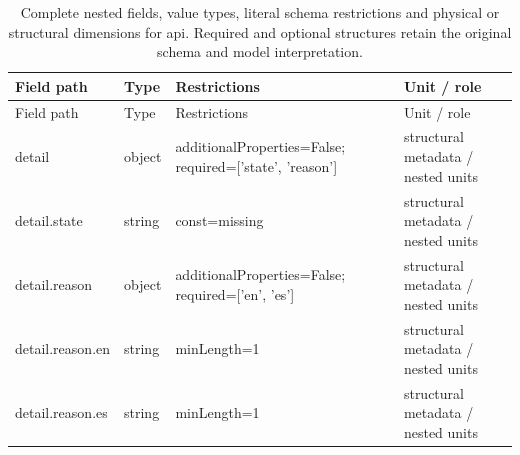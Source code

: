 \begingroup\footnotesize\setlength{\tabcolsep}{3pt}
\begin{longtable}{@{}>{\raggedright\arraybackslash}p{}>{\raggedright\arraybackslash}p{}>{\raggedright\arraybackslash}p{}>{\raggedright\arraybackslash}p{}@{}}
\caption{Complete nested fields, value types, literal schema restrictions and physical or structural dimensions for api. Required and optional structures retain the original schema and model interpretation.}\label{tab:nested-api}\\
\toprule Field path & Type & Restrictions & Unit / role\\\midrule\endfirsthead
\toprule Field path & Type & Restrictions & Unit / role\\\midrule\endhead
\bottomrule\endfoot
detail & object & additionalProperties=\allowbreak{}False; required=\allowbreak{}['state', 'reason'] & structural metadata /\allowbreak{} nested units\\
detail.\allowbreak{}state & string & const=\allowbreak{}missing & structural metadata /\allowbreak{} nested units\\
detail.\allowbreak{}reason & object & additionalProperties=\allowbreak{}False; required=\allowbreak{}['en', 'es'] & structural metadata /\allowbreak{} nested units\\
detail.\allowbreak{}reason.\allowbreak{}en & string & minLength=\allowbreak{}1 & structural metadata /\allowbreak{} nested units\\
detail.\allowbreak{}reason.\allowbreak{}es & string & minLength=\allowbreak{}1 & structural metadata /\allowbreak{} nested units\\
\end{longtable}\endgroup
